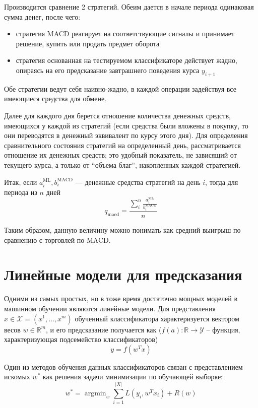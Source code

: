 \documentclass[pdftex,14pt,a4paper]{extreport}
\DeclareMathOperator*{\argmin}{argmin}
\begin{document}
Производится сравнение 2 стратегий. Обеим дается в начале периода одинаковая сумма денег, после чего:
\begin{itemize}
\item стратегия MACD реагирует на соответствующие сигналы и принимает решение, купить или продать предмет оборота
\item стратегия основанная на тестируемом классификаторе действует жадно, опираясь на его предсказание завтрашнего
поведения курса $y_{i+1}$
\end{itemize}
Обе стратегии ведут себя наивно-жадно, в каждой операции задействуя все имеющиеся средства для обмене.

Далее для каждого дня берется отношение количества денежных средств, имеющихся у каждой из стратегий (если средства были
вложены в покупку, то они переводятся в денежный эквивалент по курсу этого дня). Для определения сравнительного состояния
стратегий на определенный день, рассматривается отношение их денежных средств; это удобный показатель, не зависящий
от текущего курса, а только от ``объема благ'', накопленных каждой стратегией.

Итак, если $a^{\text{ML}}_i, b^{\text{MACD}}_i$ --- денежные средства стратегий на день $i$, тогда для периода из $n$ дней
\begin{equation}
q_\text{macd} = \frac{\sum_i^n \frac{a^{\text{ML}}_i}{b^{\text{MACD}}_i}}{n}
\end{equation}

Таким образом, данную величину можно понимать как средний выигрыш по сравнению с торговлей по MACD.

\section{Линейные модели для предсказания}

Одними из самых простых, но в тоже время достаточно мощных моделей в машинном обучении являются линейные модели\cite{linear_cls}.
Для представления $x\in\mathcal{X}=(x^1,\ldots,x^m)$ обученный классификатора характеризуется вектором весов $w\in\mathbb{R}^m$,
и его предсказание получается как ($f(a) : \mathbb{R}\to\mathcal{Y}$ -- функция,
характеризующая подсемейство классификаторов)
\begin{equation}
y=f(w^Tx)
\end{equation}

Один из методов обучения данных классификаторов связан с представлением искомых $w^*$ как решения задачи минимизации
по обучающей выборке:
\begin{equation}
w^*=\argmin_w \sum_{i=1}^{|X|} L(y_i,w^Tx_i) + R(w)
\end{equation}
\end{document}
